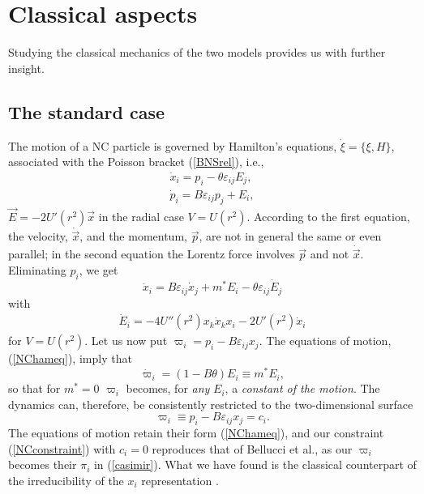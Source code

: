 \documentclass[a4paper,11pt]{article}
\let\ssection=\section
\renewcommand{\section}{\setcounter{equation}{0}\ssection}
\newcommand{\vx}{{\vec x}}
\def\vp{{\vec p}}
\def\vx{{\vec x}}
\begin{document}
\section{Classical aspects}

Studying the classical mechanics
of the two models provides us with further insight.

\subsection{The standard case}

The motion of a NC particle is governed by  Hamilton's equations,
$\dot{\xi}=\{\xi,H\}$, associated with the Poisson bracket
(\ref{BNSrel}), i.e.,
\begin{equation}
     \begin{array}{ll}
     \dot{x}_{i}
     =p_{i}-\theta\varepsilon_{ij}E_{j},
     \\[6pt]
     \dot{p}_{i}
     =B\varepsilon_{ij}p_{j}+E_{i},
     \label{NChameq}
     \end{array}
\end{equation}
$\vec{E}=-2U'(r^2)\vec{x}$
in the radial case $V=U(r^2)$.
According to the first equation, the velocity, $\dot{\vx}$, and the
momentum, $\vp$, are not in general the same or even parallel; in
the second equation the Lorentz force involves
$\vp$ and not $\dot{\vx}$.
  Eliminating $p_{i}$, we get
\begin{equation}
     \ddot{x}_{i}=
     B\varepsilon_{ij}\dot{x}_{j}+m^*E_{i}-\theta\varepsilon_{ij}
     \dot{E}_{j}
     \label{NCcleqmot}
\end{equation}
with
\begin{eqnarray*}
\dot{E}_{i}=-4U''(r^2)x_{k}\dot{x}_{k}x_{i}-2U'(r^2)\dot{x}_{i}
\end{eqnarray*}
for $V=U(r^2)$. Let us now put
$
\varpi_{i}=p_{i}-B\varepsilon_{ij}x_{j}.
$
The equations of motion, (\ref{NChameq}),  imply that
\begin{equation}
\dot{\varpi}_{i}=(1-B\theta)E_{i}\equiv m^*E_{i},
\label{varpivar}
\end{equation}
so that for $m^*=0$ $\varpi_{i}$
becomes, for {\it any} $E_{i}$, a {\it constant of the motion}.
  The dynamics can, therefore,
be consistently restricted to the two-dimensional surface
\begin{equation}
     \varpi_{i}\equiv
     p_{i}-B\varepsilon_{ij}x_{j}=c_{i}.
  \label{NCconstraint}
  \end{equation}
  The equations of motion retain their
form (\ref{NChameq}), and
our constraint (\ref{NCconstraint}) with $c_{i}=0$
reproduces that of Bellucci et al.,
as our $\varpi_{i}$ becomes their $\pi_{i}$ in (\ref{casimir}).
What we have found is the classical counterpart of
the irreducibility of the $x_{i}$ representation \cite{Sochi}.
\end{document}
